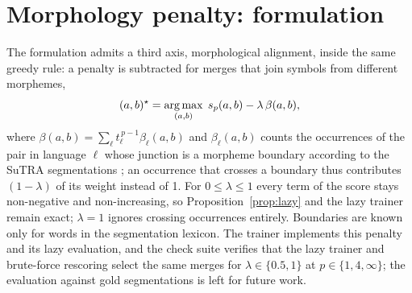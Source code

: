 \begin{table}[t]
\centering
\small
{}
\caption{Budgets per script for ten scripts at $K=64\mathrm{k}$ (14 languages at natural balance), with the fitted cost curves.}
\label{tab:alloc10}
\end{table}

\section{Morphology penalty: formulation}
\label{app:morph}

The formulation admits a third axis, morphological alignment, inside the same greedy rule:
a penalty is subtracted for merges that join symbols from different morphemes,
\begin{equation}
  (a,b)^\star = \operatorname*{arg\,max}_{(a,b)}\; s_p(a,b) - \lambda\,\beta(a,b),
  \label{eq:morph}
\end{equation}
where $\beta(a,b)=\sum_\ell t_\ell^{\,p-1}\beta_\ell(a,b)$ and $\beta_\ell(a,b)$ counts the
occurrences of the pair in language $\ell$ whose junction is a morpheme boundary according
to the SuTRA segmentations \citep{rathore2026}; an occurrence that crosses a boundary thus
contributes $(1-\lambda)$ of its weight instead of 1. For $0\le\lambda\le1$ every term of
the score stays non-negative and non-increasing, so Proposition~\ref{prop:lazy} and the
lazy trainer remain exact; $\lambda=1$ ignores crossing occurrences entirely. Boundaries are
known only for words in the segmentation lexicon. The trainer implements this penalty and its lazy evaluation, and the check suite verifies that
the lazy trainer and brute-force rescoring select the same merges for $\lambda\in\{0.5,1\}$ at
$p\in\{1,4,\infty\}$; the evaluation against gold segmentations is left for future work.

